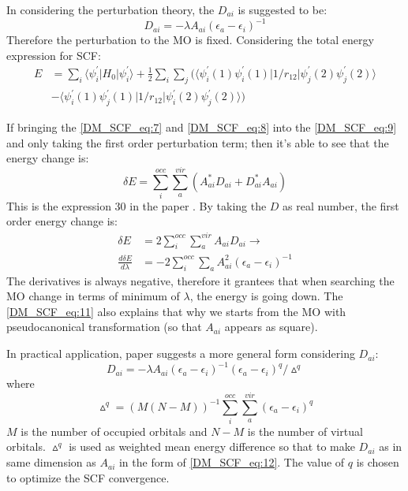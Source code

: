 In considering the perturbation theory, the $D_{ai}$ is suggested to be:
\begin{equation}\label{DM_SCF_eq:8}
 D_{ai} = -\lambda A_{ai}(\epsilon_{a} - \epsilon_{i})^{-1}
\end{equation}
Therefore the perturbation to the MO is fixed. Considering the total energy expression for 
SCF:
\begin{align}\label{DM_SCF_eq:9}
 E &= \sum_{i}\langle\psi_{i}^{'}|H_{0}|\psi_{i}^{'}\rangle  
    + \frac{1}{2}\sum_{i}\sum_{j}
\biggl(\langle\psi_{i}^{'}(1)\psi_{i}^{'}(1)|1/r_{12}|\psi_{j}^{'}(2)\psi_{j}^{'}(2)\rangle
\nonumber \\
   &- 
       \langle\psi_{i}^{'}(1)\psi_{j}^{'}(1)|1/r_{12}|\psi_{i}^{'}(2)\psi_{j}^{'}(2)\rangle\biggr)
\end{align}

If bringing the \ref{DM_SCF_eq:7} and \ref{DM_SCF_eq:8} into the \ref{DM_SCF_eq:9} and only
taking the first order perturbation term; then it's able to see that the energy change is:
\begin{equation}\label{DM_SCF_eq:10}
 \delta E = \sum_{i}^{occ}\sum_{a}^{vir}(A_{ai}^{*}D_{ai} + D_{ai}^{*}A_{ai})
\end{equation}
This is the expression 30 in the paper \cite{DM_SCF}. By taking the $D$ as real number,
the first order energy change is:
\begin{align}\label{DM_SCF_eq:11}
 \delta E &= 2\sum_{i}^{occ}\sum_{a}^{vir}A_{ai}D_{ai} \rightarrow     \nonumber \\
  \frac{d \delta E}{d \lambda}  &=
  -2\sum_{i}^{occ}\sum_{a}A^{2}_{ai}(\epsilon_{a} - \epsilon_{i})^{-1}
\end{align}
The derivatives is always negative, therefore it grantees that when searching the MO change 
in terms of minimum of $\lambda$, the energy is going down. The \ref{DM_SCF_eq:11} also 
explains that why we starts from the MO with pseudocanonical transformation (so that $A_{ai}$ 
appears as square).

In practical application, paper \cite{DM_SCF} suggests a more general form considering $D_{ai}$:
\begin{equation}\label{DM_SCF_eq:12}
 D_{ai} = -\lambda A_{ai}(\epsilon_{a} - \epsilon_{i})^{-1}
 (\epsilon_{a} - \epsilon_{i})^{q}/\vartriangle^{q}
\end{equation}
where 
\begin{equation}\label{DM_SCF_eq:13}
 \vartriangle^{q} = (M(N-M))^{-1}\sum^{occ}_{i}\sum^{vir}_{a}(\epsilon_{a} - \epsilon_{i})^{q}
\end{equation}
$M$ is the number of occupied orbitals and $N-M$ is the number of virtual orbitals.
$\vartriangle^{q}$ is used as weighted mean energy difference so that to make $D_{ai}$
as in same dimension as $A_{ai}$ in the form of \ref{DM_SCF_eq:12}. The value of $q$
is chosen to optimize the SCF convergence.
 
